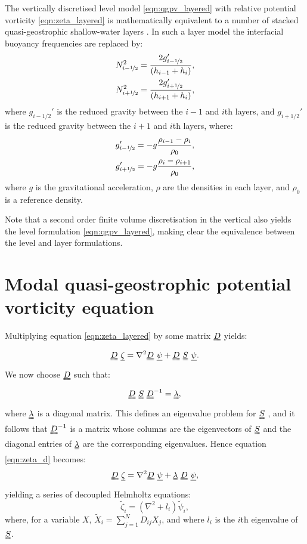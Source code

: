 \documentclass[a4paper]{book}
\begin{document}
The vertically discretised level model \eqref{eqn:qgpv_layered}
with relative potential vorticity \eqref{eqn:zeta_layered} is
mathematically equivalent to a number of stacked quasi-geostrophic shallow-water
layers \citep{vallis2006}. In such a layer model the interfacial buoyancy frequencies
are replaced by:
\begin{align}
  N_{i - \nicefrac{1}{2}}^2 = \frac{2 g_{i - \nicefrac{1}{2}}'}{\left( h_{i - 1} + h_i \right)}, \nonumber \\
  N_{i + \nicefrac{1}{2}}^2 = \frac{2 g_{i + \nicefrac{1}{2}}'}{\left( h_{i + 1} + h_i \right)}, \nonumber
\end{align}
where $g_{i - 1 / 2}'$ is the reduced gravity between the $i - 1$ and
$i$th layers, and $g_{i + 1 / 2}'$ is the reduced gravity between the
$i + 1$ and $i$th layers, where:
\begin{align}
  g_{i - \nicefrac{1}{2}}' = -g \frac{\rho_{i - 1} - \rho_i}{\rho_0}, \nonumber \\
  g_{i + \nicefrac{1}{2}}' = -g \frac{\rho_i - \rho_{i + 1}}{\rho_0},
\end{align}
where $g$ is the gravitational acceleration, $\rho$ are the densities in each
layer, and $\rho_0$ is a reference density.

Note that a second order finite volume discretisation in the vertical also
yields the level formulation \eqref{eqn:qgpv_layered}, making clear the
equivalence between the level and layer formulations.

\section{Modal quasi-geostrophic potential vorticity equation}\label{sect:qgpv_modal}

Multiplying equation \eqref{eqn:zeta_layered} by some matrix $\uuline{D}$
yields:
\begin{equation}\label{eqn:zeta_d}
  \uuline{D}~\uline{\zeta} = \nabla^2 \uuline{D}~\uline{\psi} + \uuline{D}~\uuline{S}~\uline{\psi}.
\end{equation}
We now choose $\uuline{D}$ such that:
\begin{equation}\label{eqn:s_diagonalisation}
  \uuline{D}~\uuline{S}~\uuline{D}^{-1} = \uuline{\lambda} ,
\end{equation}
where $\uuline{\lambda}$ is a diagonal matrix. This defines an eigenvalue
problem for $\uuline{S}$ \citep{strang1988}, and it follows that $\uuline{D}^{-1}$ is a matrix whose columns are the
eigenvectors of $\uuline{S}$ and the diagonal entries of $\uuline{\lambda}$
are the corresponding eigenvalues. Hence equation \eqref{eqn:zeta_d} becomes:
\begin{equation}
  \uuline{D}~\uline{\zeta} = \nabla^2 \uuline{D}~\uline{\psi} + \uuline{\lambda}~\uuline{D}~\uline{\psi},
\end{equation}
yielding a series of decoupled Helmholtz equations:
\begin{equation}\label{eqn:zeta_modal}
  \tilde{\zeta}_i = \left( \nabla^2 + l_i \right) \tilde{\psi}_i,
\end{equation}
where, for a variable $X$, $\tilde{X}_i = \sum_{j = 1}^N D_{ij} X_j$, and where
$l_i$ is the $i$th eigenvalue of $\uuline{S}$.
\end{document}
